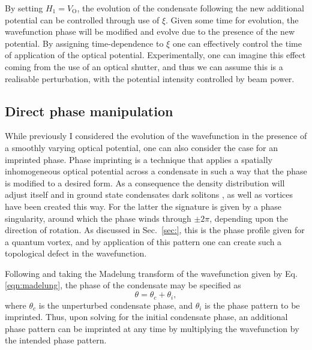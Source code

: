 By setting $H_1 = V_{\textrm{O}}$, the evolution of the condensate following the new additional potential can be controlled through use of $\xi$. Given some time for evolution, the wavefunction phase will be modified and evolve due to the presence of the new potential. By assigning time-dependence to $\xi$ one can effectively control the time of application of the optical potential. Experimentally, one can imagine this effect coming from the use of an optical shutter, and thus we can assume this is a realisable perturbation, with the potential intensity controlled by beam power.

\subsection{Direct phase manipulation}\label{sec:phase}

While previously I considered the evolution of the wavefunction in the presence of a smoothly varying optical potential, one can also consider the case for an imprinted phase. Phase imprinting is a technique that applies a spatially inhomogeneous optical potential across a condensate in such a way that the phase is modified to a desired form. As a consequence the density distribution will adjust itself and in ground state condensates dark solitons \cite{BEC:Denschlag_science_2000}, as well as vortices \cite{Vtx:Dobrek_pra_1999} have been created this way. For the latter the signature is given by a phase singularity, around which the phase winds through $\pm 2\pi$, depending upon the direction of rotation. As discussed in Sec.~\ref{sec:}, this is the phase profile given for a quantum vortex, and by application of this pattern one can create such a topological defect in the wavefunction.

Following \cite{BK:Pitaevskii_Stringari_2003} and taking the Madelung transform of the wavefunction given by Eq. \eqref{eqn:madelung}, the phase of the condensate may be specified as
\begin{equation}
\theta = \theta_c + \theta_i,
\end{equation}
where $\theta_c$ is the unperturbed condensate phase, and $\theta_i$ is the phase pattern to be imprinted. Thus, upon solving for the initial condensate phase, an additional phase pattern can be imprinted at any time by multiplying the wavefunction by the intended phase pattern.

